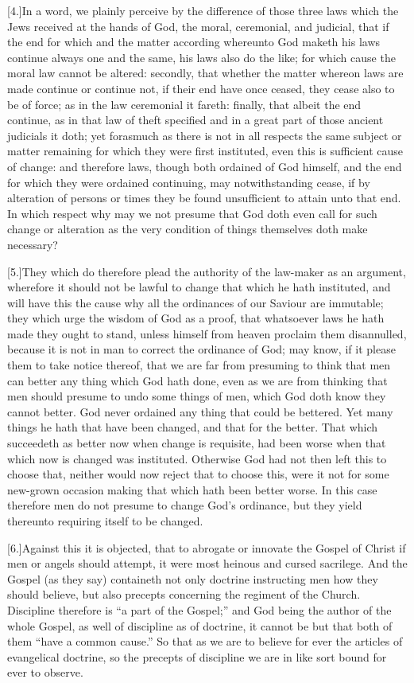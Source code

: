 [4.]In a word, we plainly perceive by the difference of those three laws which the Jews received at the hands of God, the moral, ceremonial, and judicial, that if the end for which and the matter according whereunto God maketh his laws continue always one and the same, his laws also do the like; for which cause the moral law cannot be altered: secondly, that whether the matter whereon laws are made continue or continue not, if their end have once ceased, they cease also to be of force; as in the law ceremonial it fareth: finally, that albeit the end continue, as in that law of theft specified and in a great part of those ancient judicials it doth; yet forasmuch as there is not in all respects the same subject or matter remaining for which they were first instituted, even this is sufficient cause of change: and therefore laws, though both ordained of God himself, and the end for which they were ordained continuing, may notwithstanding cease, if by alteration of persons or times they be found unsufficient to attain unto that end. In which respect why may we not presume that God doth even call for such change or alteration as the very condition of things themselves doth make necessary?

[5.]They which do therefore plead the authority of the law-maker as an argument, wherefore it should not be lawful to change that which he hath instituted, and will have this the cause why all the ordinances of our Saviour are immutable; they which urge the wisdom of God as a proof, that whatsoever laws he hath made they ought to stand, unless himself from heaven proclaim them disannulled, because it is not in man to correct the ordinance of God; may know, if it please them to take notice thereof, that we are far from presuming to think that men can better any thing which God hath done, even as we are from thinking that men should presume to undo some things of men, which God doth know they cannot better. God never ordained any thing that could be bettered. Yet many things he hath that have been changed, and that for the better. That which succeedeth as better now when change is requisite, had been worse when that which now is changed was instituted. Otherwise God had not then left this to choose that, neither would now reject that to choose this, were it not for some new-grown occasion making that which hath been better worse. In this case therefore men do not presume to change God’s ordinance, but they yield thereunto requiring itself to be changed.

[6.]Against this it is objected, that to abrogate or innovate the Gospel of Christ if men or angels should attempt, it were most heinous and cursed sacrilege. And the Gospel (as they say) containeth not only doctrine instructing men how they should believe, but also precepts concerning the regiment of the Church. Discipline therefore is “a part of the Gospel;” and God being the author of the whole Gospel, as well of discipline as of doctrine, it cannot be but that both of them “have a common cause.” So that as we are to believe for ever the articles of evangelical doctrine, so the precepts of discipline we are in like sort bound for ever to observe.


